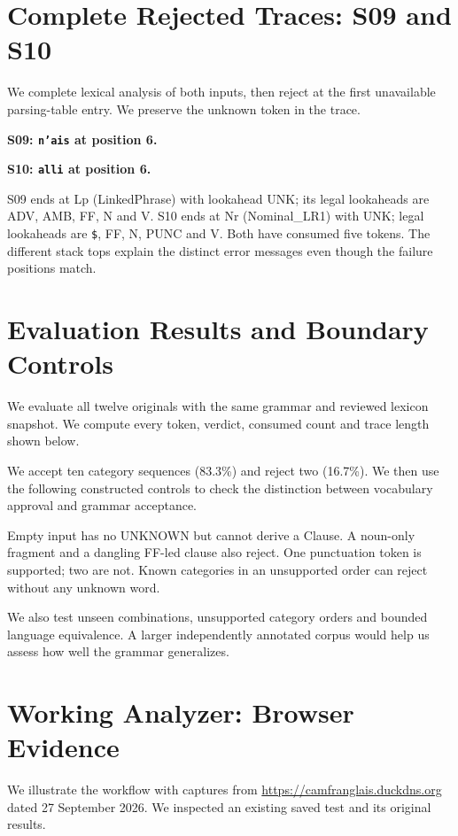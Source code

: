 \documentclass[11pt]{article}
\newcommand{\code}[1]{\texttt{#1}}
\begin{document}
\clearpage
\section{Complete Rejected Traces: S09 and S10}
We complete lexical analysis of both inputs, then reject at the first
unavailable parsing-table entry. We preserve the unknown token in the trace.

\textbf{S09: \code{n'ais} at position 6.}
{\scriptsize\renewcommand{\arraystretch}{1.02}}

\textbf{S10: \code{alli} at position 6.}
{\scriptsize\renewcommand{\arraystretch}{1.02}}

S09 ends at Lp (LinkedPhrase) with lookahead UNK; its legal lookaheads are
ADV, AMB, FF, N and V. S10 ends at Nr (Nominal\_LR1) with UNK; legal
lookaheads are \code{\$}, FF, N, PUNC and V. Both have consumed five tokens.
The different stack tops explain the distinct error messages even though the
failure positions match.

\clearpage
\section{Evaluation Results and Boundary Controls}
We evaluate all twelve originals with the same grammar and reviewed lexicon
snapshot. We compute every token, verdict, consumed count and trace length
shown below.

{\small\renewcommand{\arraystretch}{1.2}}

We accept ten category sequences (83.3\%) and reject two (16.7\%).
We then use the following constructed controls to check the distinction
between vocabulary approval and grammar acceptance.

{\small\renewcommand{\arraystretch}{1.2}}

Empty input has no UNKNOWN but cannot derive a Clause. A noun-only fragment
and a dangling FF-led clause also reject. One punctuation token is supported;
two are not. Known categories in an unsupported order can reject without any
unknown word.

We also test unseen combinations, unsupported category orders and bounded
language equivalence. A larger independently annotated corpus would help us
assess how well the grammar generalizes.

\clearpage
\section{Working Analyzer: Browser Evidence}
We illustrate the workflow with captures from
\url{https://camfranglais.duckdns.org} dated 27 September 2026. We inspected
an existing saved test and its original results.
\end{document}
